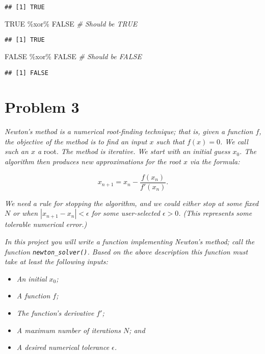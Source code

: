 \documentclass[
]{article}
\newenvironment{Shaded}{\begin{snugshade}}{\end{snugshade}}
\newcommand{\CommentTok}[1]{\textcolor[rgb]{0.56,0.35,0.01}{\textit{#1}}}
\newcommand{\ConstantTok}[1]{\textcolor[rgb]{0.00,0.00,0.00}{#1}}
\newcommand{\SpecialCharTok}[1]{\textcolor[rgb]{0.00,0.00,0.00}{#1}}
\providecommand{\tightlist}{%
  \setlength{\itemsep}{0pt}\setlength{\parskip}{0pt}}
\begin{document}
\begin{verbatim}
## [1] TRUE
\end{verbatim}

\begin{Shaded}
\begin{Highlighting}[]
\ConstantTok{TRUE} \SpecialCharTok{\%xor\%} \ConstantTok{FALSE}  \CommentTok{\# Should be TRUE}
\end{Highlighting}
\end{Shaded}

\begin{verbatim}
## [1] TRUE
\end{verbatim}

\begin{Shaded}
\begin{Highlighting}[]
\ConstantTok{FALSE} \SpecialCharTok{\%xor\%} \ConstantTok{FALSE}  \CommentTok{\# Should be FALSE}
\end{Highlighting}
\end{Shaded}

\begin{verbatim}
## [1] FALSE
\end{verbatim}

\hypertarget{problem-3}{%
\section{Problem 3}\label{problem-3}}

\emph{Newton's method is a numerical root-finding technique; that is,
given a function \(f\), the objective of the method is to find an input
\(x\) such that \(f(x) = 0\). We call such an \(x\) a} root. \emph{The
method is iterative. We start with an initial guess \(x_0\). The
algorithm then produces new approximations for the root \(x\) via the
formula:}

\[x_{n + 1} = x_n - \frac{f(x_n)}{f'(x_n)}.\]

\emph{We need a rule for stopping the algorithm, and we could either
stop at some fixed \(N\) or when
\(\left|x_{n+1} - x_n\right| < \epsilon\) for some user-selected
\(\epsilon > 0\). (This represents some tolerable numerical error.)}

\emph{In this project you will write a function implementing Newton's
method; call the function \texttt{newton\_solver()}. Based on the above
description this function must take at least the following inputs:}

\begin{itemize}
\tightlist
\item
  \emph{An initial \(x_0\);}
\item
  \emph{A function \(f\);}
\item
  \emph{The function's derivative \(f'\);}
\item
  \emph{A maximum number of iterations \(N\); and}
\item
  \emph{A desired numerical tolerance \(\epsilon\).}
\end{itemize}
\end{document}
